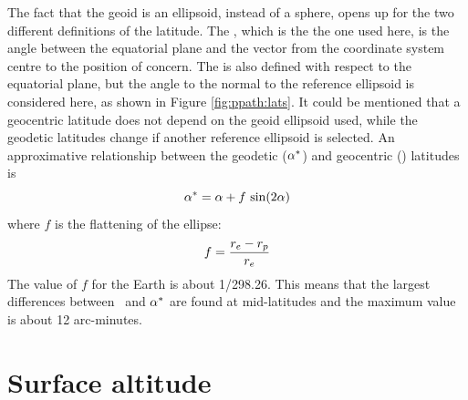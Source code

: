 The fact that the geoid is an ellipsoid, instead of a sphere, opens up
for the two different definitions of the latitude. The
, which is the the one used here, is the
angle between the equatorial plane and the vector from the coordinate
system centre to the position of concern. The  is also defined with respect to the equatorial plane, but
the angle to the normal to the reference ellipsoid is considered here, as
shown in Figure \ref{fig:ppath:lats}. It could be mentioned that a
geocentric latitude does not depend on the geoid ellipsoid used, while
the geodetic latitudes change if another reference ellipsoid is
selected. An approximative relationship between the geodetic
($\alpha^*$) and geocentric (\Lat) latitudes is \citep{montenbruck:00}
\begin{equation}
 \alpha^* = \alpha + f\,\sin(2\alpha)  
 \label{eq:ppath:lats}
\end{equation}
where $f$ is the flattening of the ellipse:
\begin{equation}
 f = \frac{r_{e}-r_{p}}{r_{e}}
 \label{eq:ppath:flattening}
\end{equation}
The value of $f$ for the Earth is about 1/298.26. This means that the
largest differences between \Lat\ and $\alpha^*$ are found at
mid-latitudes and the maximum value is about 12 arc-minutes.







\section{Surface altitude}

